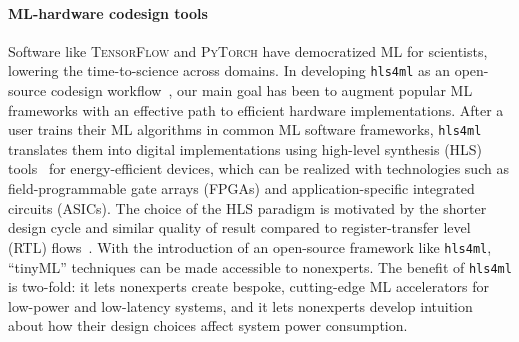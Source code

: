 \documentclass[tinyml]{acmart}
\newcommand{\hlsfml}{\texttt{hls4ml}\xspace}
\begin{document}
\paragraph{\textbf{ML-hardware codesign tools}}
Software like \textsc{TensorFlow} and \textsc{PyTorch} have democratized ML for scientists, lowering the time-to-science across domains.
In developing \hlsfml as an open-source codesign workflow~\cite{Duarte:2018ite,hls4ml}, our main goal has been to augment popular ML frameworks with an effective path to efficient hardware implementations.
After a user trains their ML algorithms in common ML software frameworks, \hlsfml translates them into digital implementations using high-level synthesis (HLS) tools~\cite{surveyHLS} for energy-efficient devices, which can be realized with technologies such as field-programmable gate arrays (FPGAs) and application-specific integrated circuits (ASICs).
The choice of the HLS paradigm is motivated by the shorter design cycle and similar quality of result compared to register-transfer level (RTL) flows~\cite{arewethereyet}.
With the introduction of an open-source framework like \hlsfml, ``tinyML'' techniques can be made accessible to nonexperts.
The benefit of \hlsfml is two-fold: it lets nonexperts create bespoke, cutting-edge ML accelerators for low-power and low-latency systems, and it lets nonexperts develop intuition about how their design choices affect system power consumption.
\end{document}
